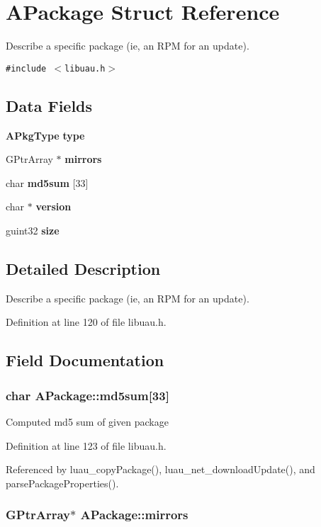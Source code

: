\section{APackage Struct Reference}
\label{structAPackage}
Describe a specific package (ie, an RPM for an update).  


{\tt \#include $<$libuau.h$>$}

\subsection*{Data Fields}
\begin{CompactItemize}
\item 
{\bf APkg\-Type} {\bf type}
\item 
GPtr\-Array $\ast$ {\bf mirrors}
\item 
char {\bf md5sum} [33]
\item 
char $\ast$ {\bf version}
\item 
guint32 {\bf size}
\end{CompactItemize}


\subsection{Detailed Description}
Describe a specific package (ie, an RPM for an update). 



Definition at line 120 of file libuau.h.

\subsection{Field Documentation}
\subsubsection{\setlength{\rightskip}{0pt plus 5cm}char {\bf APackage::md5sum}[33]}\label{structAPackage_o2}


Computed md5 sum of given package 

Definition at line 123 of file libuau.h.

Referenced by luau\_\-copy\-Package(), luau\_\-net\_\-download\-Update(), and parse\-Package\-Properties().
\subsubsection{\setlength{\rightskip}{0pt plus 5cm}GPtr\-Array$\ast$ {\bf APackage::mirrors}}\label{structAPackage_o1}


